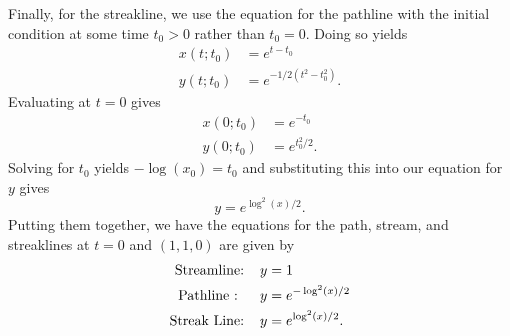\documentclass{article}
\begin{document}
\begin{itemize}
    Finally, for the streakline, we use the equation for the pathline with the initial condition at some time $t_0 > 0$ rather than $t_0 = 0$. Doing so yields 
    \begin{align*}
        x(t;t_0) &= e^{t - t_0}\\
        y(t;t_0) & = e^{-1/2(t^2 - t_0^2)}.
    \end{align*}
    Evaluating at $t = 0$ gives 
    \begin{align*}
        x(0;t_0) &= e^{-t_0}\\
        y(0;t_0) &= e^{t_0^2/2}.
    \end{align*}
    Solving for $t_0$ yields $-\log(x_0) = t_0$ and substituting this into our equation for $y$ gives
    \[y = e^{\log^2(x)/2}.\]
    Putting them together, we have the equations for the path, stream, and streaklines at $t = 0$ and $(1,1,0)$ are given by
    \begin{align*}
        \text{Streamline:} \hspace{0.4cm} y &= 1\\
        \text{Pathline : } \hspace{0.4cm} y &= e^{-\log^2(x)/2}\\
        \text{Streak Line:} \hspace{0.4cm} y &= e^{\log^2(x)/2}.
    \end{align*}
    
    
    

\end{itemize}
\end{document}
